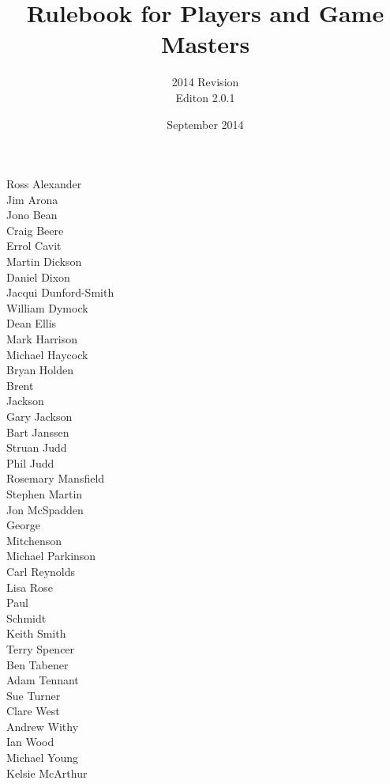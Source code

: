 \documentclass[a4paper]{report}
\begin{document}
\title{Rulebook for Players and Game Masters\\ \coverpic}
\author{2014 Revision\\Editon 2.0.1}
\date{September 2014}

\maketitle

\begin{Contributors}
Ross Alexander \\
Jim Arona \\
Jono Bean \\
Craig Beere \\
Errol Cavit \\
Martin Dickson \\
Daniel Dixon \\
Jacqui Dunford-Smith \\
William Dymock \\
Dean Ellis \\
Mark Harrison \\
Michael Haycock \\
Bryan Holden \\
Brent \\
Jackson \\
Gary Jackson \\
Bart Janssen \\
Struan Judd \\
Phil Judd \\
Rosemary Mansfield \\
Stephen Martin \\
Jon McSpadden \\
George \\
Mitchenson \\
Michael Parkinson \\
Carl Reynolds \\
Lisa Rose \\
Paul \\
Schmidt \\
Keith Smith \\
Terry Spencer \\
Ben Tabener \\
Adam Tennant \\
Sue Turner \\
Clare West \\
Andrew Withy \\
Ian Wood \\
Michael Young \\
Kelsie McArthur \\
\end{Contributors}
\end{document}
